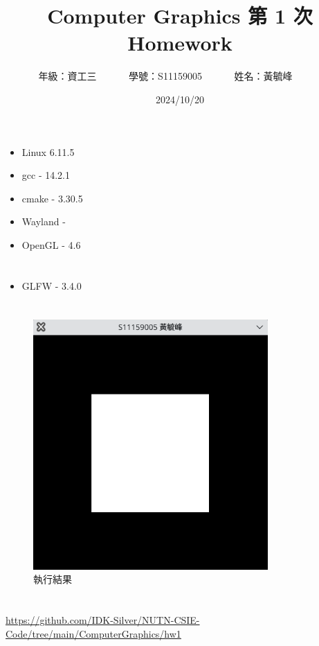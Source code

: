 \documentclass[12pt,a4paper]{article}
\begin{document}
\title{
  {
    \heiti Computer Graphics 第 1 次 Homework
  }
}


\date{2024/10/20}
\author{
  年級：{資工三}~~~~~~
  學號：{S11159005}~~~~~~
  姓名：{黃毓峰}~~~~~~
}

\maketitle
\newlength{\question}
\settowidth{\question}{XX}

\section*{\heiti \color{black}{電腦軟體系統簡介}}

\begin{itemize}
  \item Linux 6.11.5
  \item gcc - 14.2.1
  \item cmake - 3.30.5
  \item Wayland - 
  \item OpenGL - 4.6 
\end{itemize}

\section*{\heiti \color{black}{GLFW函式庫名稱與版本}}

\begin{itemize}
  \item GLFW - 3.4.0
\end{itemize}
\newpage
\section*{\heiti \color{black}{編譯後的執行成果}}
\begin{figure}[h]
  \centering
  \includegraphics[width=0.8\textwidth]{img/hw1_result.png}
  \caption{執行結果}
\end{figure}


\section*{\heiti \color{black}{SourceCode}}
\sloppy
\noindent \url{https://github.com/IDK-Silver/NUTN-CSIE-Code/tree/main/ComputerGraphics/hw1}
\end{document}
